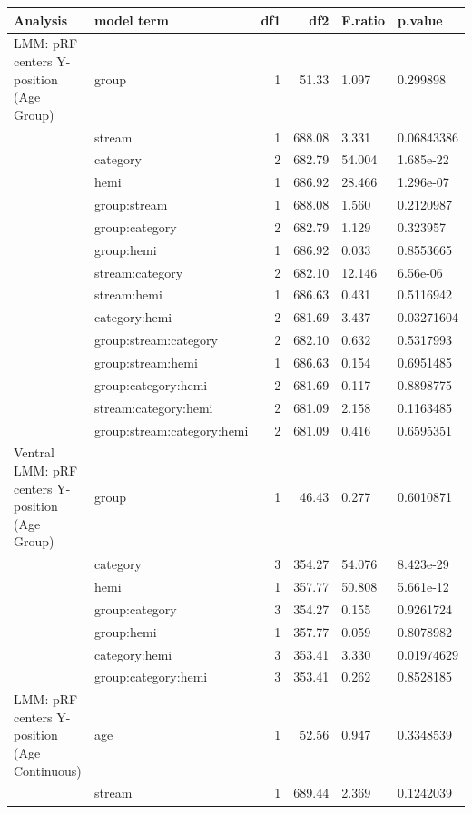 \begin{table}
\centering
\begin{tabular}{llrrll}
\toprule
Analysis & model term & df1 & df2 & F.ratio & p.value\\
\midrule
LMM: pRF centers Y-position (Age Group) & group & 1 & 51.33 & 1.097 & 0.299898\\
 & stream & 1 & 688.08 & 3.331 & 0.06843386\\
 & category & 2 & 682.79 & 54.004 & 1.685e-22\\
 & hemi & 1 & 686.92 & 28.466 & 1.296e-07\\
 & group:stream & 1 & 688.08 & 1.560 & 0.2120987\\
\addlinespace
 & group:category & 2 & 682.79 & 1.129 & 0.323957\\
 & group:hemi & 1 & 686.92 & 0.033 & 0.8553665\\
 & stream:category & 2 & 682.10 & 12.146 & 6.56e-06\\
 & stream:hemi & 1 & 686.63 & 0.431 & 0.5116942\\
 & category:hemi & 2 & 681.69 & 3.437 & 0.03271604\\
\addlinespace
 & group:stream:category & 2 & 682.10 & 0.632 & 0.5317993\\
 & group:stream:hemi & 1 & 686.63 & 0.154 & 0.6951485\\
 & group:category:hemi & 2 & 681.69 & 0.117 & 0.8898775\\
 & stream:category:hemi & 2 & 681.09 & 2.158 & 0.1163485\\
 & group:stream:category:hemi & 2 & 681.09 & 0.416 & 0.6595351\\
\addlinespace
Ventral LMM: pRF centers Y-position (Age Group) & group & 1 & 46.43 & 0.277 & 0.6010871\\
 & category & 3 & 354.27 & 54.076 & 8.423e-29\\
 & hemi & 1 & 357.77 & 50.808 & 5.661e-12\\
 & group:category & 3 & 354.27 & 0.155 & 0.9261724\\
 & group:hemi & 1 & 357.77 & 0.059 & 0.8078982\\
\addlinespace
 & category:hemi & 3 & 353.41 & 3.330 & 0.01974629\\
 & group:category:hemi & 3 & 353.41 & 0.262 & 0.8528185\\
LMM: pRF centers Y-position (Age Continuous) & age & 1 & 52.56 & 0.947 & 0.3348539\\
 & stream & 1 & 689.44 & 2.369 & 0.1242039\\

\end{tabular}
\end{table}
